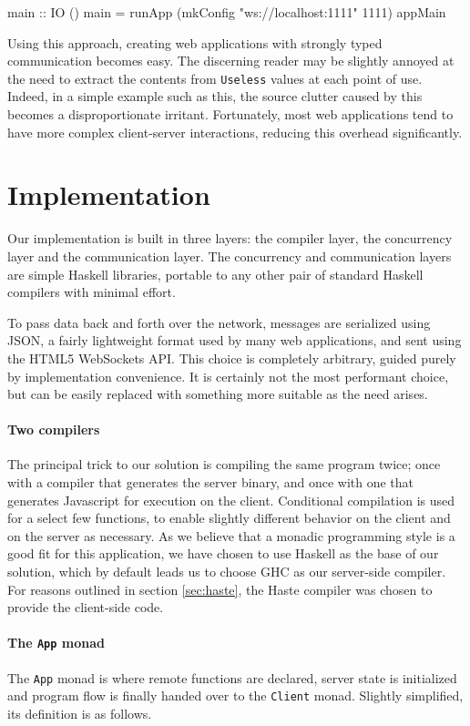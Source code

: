 \documentclass[preprint]{sigplanconf}
\begin{document}
\begin{code}
main :: IO ()
main =
  runApp (mkConfig "ws://localhost:1111" 1111) appMain
\end{code}

Using this approach, creating web applications with strongly typed
communication becomes easy. The discerning reader may be slightly annoyed at
the need to extract the contents from \lstinline!Useless! values at each point
of use. Indeed, in a simple example such as this, the source clutter caused by
this becomes a disproportionate irritant. Fortunately, most web applications
tend to have more complex client-server interactions, reducing this overhead
significantly.

\section{Implementation}

Our implementation is built in three layers: the compiler layer, the
concurrency layer and the communication layer. The concurrency and
communication layers are simple Haskell libraries, portable to any other pair
of standard Haskell compilers with minimal effort.

To pass data back and forth over the network, messages are serialized using
JSON, a fairly lightweight format used by many web applications, and sent using
the HTML5 WebSockets API. This choice is completely arbitrary, guided purely
by implementation convenience. It is certainly not the most performant choice,
but can be easily replaced with something more suitable as the need arises.

\paragraph{Two compilers}
The principal trick to our solution is compiling the same program twice; once
with a compiler that generates the server binary, and once with one that
generates Javascript for execution on the client. Conditional compilation is
used for a select few functions, to enable slightly different behavior on the
client and on the server as necessary. As we believe that a monadic
programming style is a good fit for this application, we have chosen to use
Haskell as the base of our solution, which by default leads us to choose GHC
as our server-side compiler. For reasons outlined in section \ref{sec:haste},
the Haste compiler was chosen to provide the client-side code.

\paragraph{The \lstinline!App! monad}
The \lstinline!App! monad is where remote functions are declared, server state
is initialized and program flow is finally handed over to the \lstinline!Client!
monad. Slightly simplified, its definition is as follows.
\end{document}
